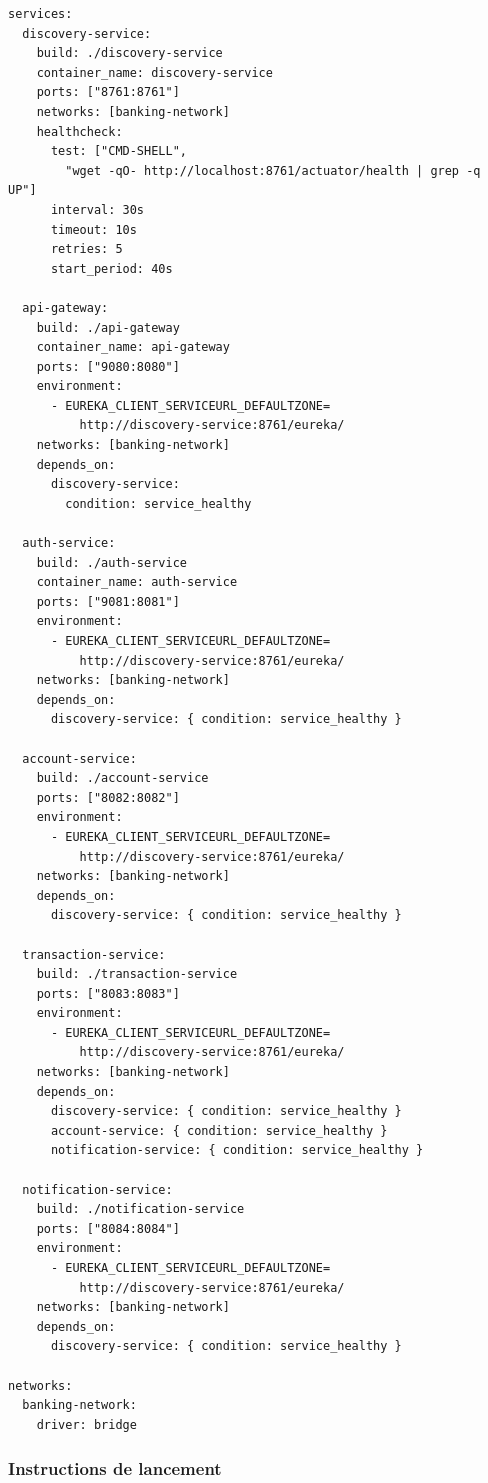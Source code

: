 \documentclass[12pt,a4paper]{article}
\begin{document}
\begin{lstlisting}[style=ymlstyle, caption={docker-compose.yml --- Orchestration de tous les services}, label=lst:compose]
services:
  discovery-service:
    build: ./discovery-service
    container_name: discovery-service
    ports: ["8761:8761"]
    networks: [banking-network]
    healthcheck:
      test: ["CMD-SHELL",
        "wget -qO- http://localhost:8761/actuator/health | grep -q UP"]
      interval: 30s
      timeout: 10s
      retries: 5
      start_period: 40s

  api-gateway:
    build: ./api-gateway
    container_name: api-gateway
    ports: ["9080:8080"]
    environment:
      - EUREKA_CLIENT_SERVICEURL_DEFAULTZONE=
          http://discovery-service:8761/eureka/
    networks: [banking-network]
    depends_on:
      discovery-service:
        condition: service_healthy

  auth-service:
    build: ./auth-service
    container_name: auth-service
    ports: ["9081:8081"]
    environment:
      - EUREKA_CLIENT_SERVICEURL_DEFAULTZONE=
          http://discovery-service:8761/eureka/
    networks: [banking-network]
    depends_on:
      discovery-service: { condition: service_healthy }

  account-service:
    build: ./account-service
    ports: ["8082:8082"]
    environment:
      - EUREKA_CLIENT_SERVICEURL_DEFAULTZONE=
          http://discovery-service:8761/eureka/
    networks: [banking-network]
    depends_on:
      discovery-service: { condition: service_healthy }

  transaction-service:
    build: ./transaction-service
    ports: ["8083:8083"]
    environment:
      - EUREKA_CLIENT_SERVICEURL_DEFAULTZONE=
          http://discovery-service:8761/eureka/
    networks: [banking-network]
    depends_on:
      discovery-service: { condition: service_healthy }
      account-service: { condition: service_healthy }
      notification-service: { condition: service_healthy }

  notification-service:
    build: ./notification-service
    ports: ["8084:8084"]
    environment:
      - EUREKA_CLIENT_SERVICEURL_DEFAULTZONE=
          http://discovery-service:8761/eureka/
    networks: [banking-network]
    depends_on:
      discovery-service: { condition: service_healthy }

networks:
  banking-network:
    driver: bridge
\end{lstlisting}

\subsubsection{Instructions de lancement}
\end{document}

